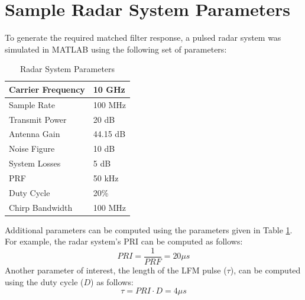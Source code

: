 \documentclass[conference]{IEEEtran}
\begin{document}
\section{Sample Radar System Parameters}
To generate the required matched filter response, a pulsed radar system was simulated in MATLAB using the following set of parameters: 
\begin{table}[H]
\caption{Radar System Parameters}
\label{Parameter Table}
\begin{tabularx}{0.5\textwidth}{| X | X |}
\hline
Carrier Frequency & 10 GHz \\
\hline
Sample Rate & 100 MHz \\
\hline
Transmit Power & 20 dB \\
\hline
Antenna Gain & 44.15 dB \\
\hline
Noise Figure & 10 dB \\
\hline 
System Losses & 5 dB \\
\hline
PRF & 50 kHz \\
\hline
Duty Cycle & 20\% \\
\hline
Chirp Bandwidth & 100 MHz \\
\hline
\end{tabularx}
\end{table}
\noindent
Additional parameters can be computed using the parameters given in Table \ref{Parameter Table}. For example, the radar system's PRI can be computed as follows:
\begin{equation}
PRI = \frac{1}{PRF} = 20 {\mu}s
\label{PRI Equation}
\end{equation}
Another parameter of interest, the length of the LFM pulse ($\tau$), can be computed using the duty cycle ($D$) as follows:
\begin{equation}
\tau = PRI \cdot D = 4 {\mu}s
\label{tau equation}
\end{equation}
\end{document}
